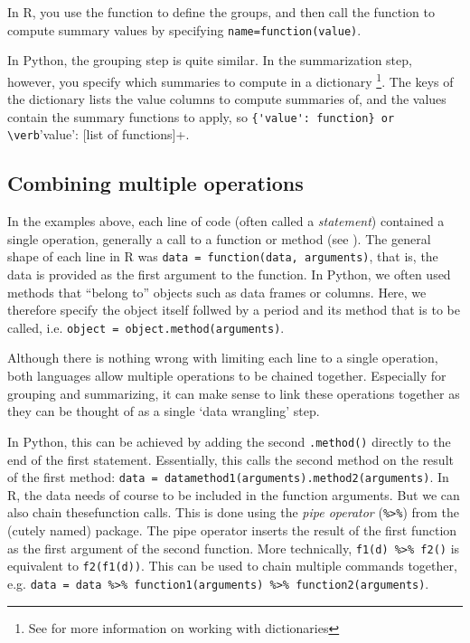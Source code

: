 
In R, you use the  function   to define the groups,
and then call the function  to compute summary values by specifying
\verb+name=function(value)+.

In Python, the grouping step is quite similar.
In the summarization step, however, you specify which summaries to compute in a dictionary%
\footnote{See  for more information on working with dictionaries}.
The keys of the dictionary lists the value columns to compute summaries of,
and the values contain the summary functions to apply, so  \verb+{'value': function} or \verb+{'value': [list of functions]}+.

\subsection{Combining multiple operations}

In the examples above, each line of code (often called a \emph{statement}) contained a single operation, generally a call to a function or method (see ).
The general shape of each line in R was \verb+data = function(data, arguments)+, that is, the data is provided as the first argument to the function.
In Python, we often used methods that ``belong to'' objects such as data frames or columns. Here, we therefore specify the object itself follwed by a period and its method that is to be called,
i.e. \verb+object = object.method(arguments)+.

Although there is nothing wrong with limiting each line to a single operation, both languages allow multiple operations to be chained together.
Especially for grouping and summarizing, it can make sense to link these operations together as they can be thought of as a single `data wrangling' step.

In Python, this can be achieved by adding the second \verb+.method()+ directly to the end of the first statement.
Essentially, this calls the second method on the result of the first method: \verb+data = datamethod1(arguments).method2(arguments)+.
In R, the data needs of course to be included in the function arguments. But we can also chain thesefunction calls.
This is done using the \emph{pipe operator} (\verb+%>%+) from the (cutely named)  package.
The pipe operator inserts the result of the first function as the first argument of the second function.
More technically, \verb+f1(d) %>% f2()+ is equivalent to \verb+f2(f1(d))+.
This can be used to chain multiple commands together, e.g. \verb+data = data %>% function1(arguments) %>% function2(arguments)+.

